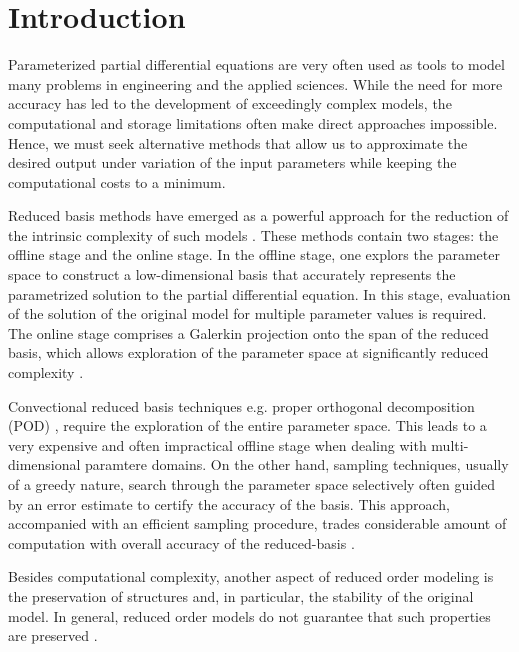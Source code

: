 \section{Introduction}
Parameterized partial differential equations are very often used as tools to model many problems in engineering and the applied sciences. While the need for more accuracy has led to the development of exceedingly complex models, the computational and storage limitations often make direct approaches impossible. Hence, we must seek alternative methods that allow us to approximate the desired output under variation of the input parameters while keeping the computational costs to a minimum.

Reduced basis methods have emerged as a powerful approach for the reduction of the intrinsic complexity of such models \cite{Ito:1998up,Ito:1998ch,Ito:2001ev,Peterson:1989ki}. These methods contain two stages: {\edit the offline stage and the online stage}. In the offline stage, one explors the parameter space to construct a low-dimensional basis that accurately represents the parametrized solution to the partial differential equation. In this stage, evaluation of the solution of the original model for multiple parameter values is required. The online stage comprises a Galerkin projection onto the span of the reduced basis, which allows exploration of the parameter space at significantly reduced complexity \cite{Antoulas:2005:ALD:1088857,Anonymous:2016wl}.

Convectional reduced basis techniques e.g. proper orthogonal decomposition (POD) \cite{Kunisch:2002er,Atwell:2001ja,Ravindran:2002hn}, require the exploration of the entire parameter space. This leads to a very expensive and often impractical offline {\edit stage} when dealing with multi-dimensional paramtere domains. On the other hand, sampling techniques, usually of a greedy nature, search through the parameter space selectively often guided by an error estimate to certify the accuracy of the basis. This approach, accompanied with an efficient sampling procedure, trades considerable amount of computation with overall accuracy of the reduced-basis \cite{Cuong:2005gd,Rozza:2005ie,Anonymous:2016wl}.

{\edit Besides} computational complexity, another aspect of reduced order modeling is the preservation of structures and, in particular, {\edit the} stability of the original model. In general, reduced order models do not guarantee that such properties are preserved \cite{Anonymous:pMn0O0Q4}. 

